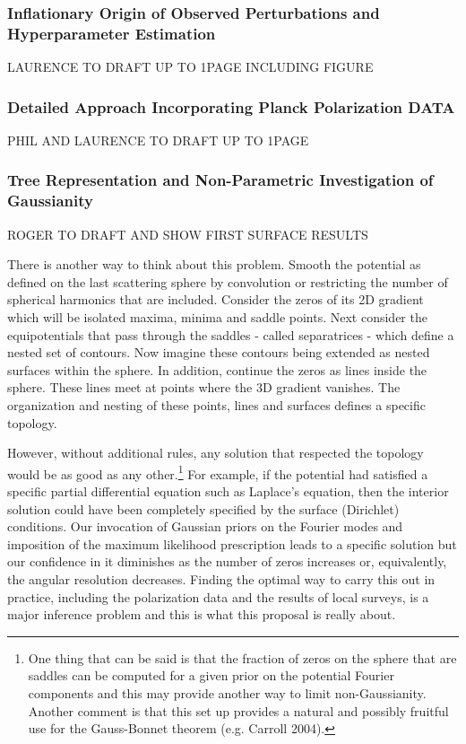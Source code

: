 \documentclass[psfig,11pt]{article}
\begin{document}
\subsubsection{Inflationary Origin of Observed Perturbations and Hyperparameter Estimation}

LAURENCE TO DRAFT UP TO 1PAGE INCLUDING FIGURE


\subsubsection{Detailed Approach Incorporating Planck Polarization DATA}

PHIL AND LAURENCE TO DRAFT UP TO 1PAGE


\subsubsection{Tree Representation and Non-Parametric Investigation of Gaussianity}

ROGER TO DRAFT AND SHOW FIRST SURFACE RESULTS

There is another way to think about this problem. Smooth the potential as defined on the last scattering sphere by convolution or restricting the number of spherical harmonics that are included. Consider the zeros of its 2D gradient which will be isolated maxima, minima and saddle points. Next consider the equipotentials that pass through the saddles - called separatrices - which define a nested set of contours. Now imagine these contours being extended as nested surfaces within the sphere. In addition, continue the zeros as lines inside the sphere. These lines meet at points where the 3D gradient vanishes. The organization and nesting of these points, lines and surfaces defines a specific topology.

However, without additional rules, any solution that respected the topology would be as good as any other.\footnote{One thing that can be said is that the fraction of zeros on the sphere that are saddles can be computed for a given prior on the potential Fourier components and this may provide another way to limit non-Gaussianity. Another comment is that this set up provides a natural and possibly fruitful use for the Gauss-Bonnet theorem (e.g. Carroll 2004).} For example, if the potential had satisfied a specific partial differential equation such as  Laplace's equation, then the interior solution could have been completely specified by the surface (Dirichlet) conditions. Our invocation of Gaussian priors on the Fourier modes and imposition of the maximum likelihood prescription leads to a specific solution but our confidence in it diminishes as the number of zeros increases or, equivalently, the angular resolution decreases. Finding the optimal way to carry this out in practice, including the polarization data and the results of local surveys, is a major inference problem and this is what this proposal is really about.
\end{document}
